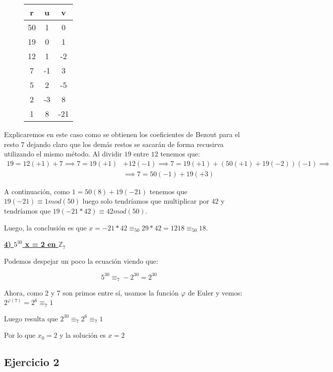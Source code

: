 \documentclass[11pt, a4paper, titlepage]{article}
\providecommand{\ent}{\mathbb{Z}}
\begin{document}
\begin{figure}[H]
\label{my-label}
\begin{center}
\begin{tabular}{|c|c|c|}
\hline
\textbf{r} & \textbf{u} & \textbf{v} \\ \hline
50         & 1          & 0          \\ \hline
19         & 0          & 1          \\ \hline
12         & 1         & -2          \\ \hline
7          & -1         & 3          \\ \hline
5          & 2          & -5         \\ \hline
2          & -3         & 8          \\ \hline
1          & 8          & -21        \\ \hline
\end{tabular}
\end{center}
\end{figure}
Explicaremos en este caso como se obtienen los coeficientes de Bezout para el resto $7$ dejando claro que los demás restos se sacarán de forma recusirva utilizando el mismo método. Al dividir $19$ entre $12$ tenemos que:
\begin{align*}
19=12(+1)+7 \implies 7=19(+1)&+12(-1) \implies 7=19(+1)+(50(+1)+19(-2))(-1)\implies \\
&\implies 7=50(-1)+19(+3)
\end{align*}

A continuación, como $1=50(8)+19(-21)$ tenemos que $19(-21)\equiv1 mod(50)$ luego solo tendríamos que multiplicar por $42$ y tendríamos que $19(-21*42)\equiv42 mod(50)$.

Luego, la conclusión es que $x=-21*42\equiv_{50}29*42=1218\equiv_{50} 18$.

\underline{\textbf{4) $5^{30}$ x = 2 en $\ent_7$ }}

Podemos despejar un poco la ecuación viendo que:

\[
5^{30} \equiv_7 -2^{30} = 2^{30}
\]

Ahora, como 2 y 7 son primos entre sí, usamos la función $\varphi $ de Euler y vemos: $2^{\varphi(7)} = 2^6 \equiv_7 1$

Luego resulta que $2^{30}\equiv_7 2^6 \equiv_7 1$

Por lo que $x_0 = 2$ y la solución es $x=2$


\subsection{\LARGE{Ejercicio 2}}
\end{document}
